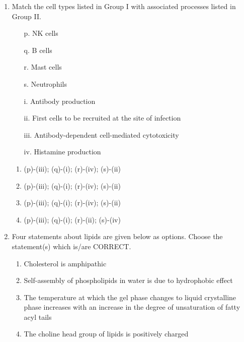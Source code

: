 \documentclass[journal,12pt,onecolumn]{IEEEtran}
\begin{document}
\begin{enumerate}
    \item \begin{minipage}{0.45\textwidth}
    Match the cell types listed in Group I with associated processes listed in Group II.
    \begin{itemize}
        \item[p.] NK cells
        \item[q.] B cells
        \item[r.] Mast cells
        \item[s.] Neutrophils
    \end{itemize}
    \end{minipage}
    \begin{minipage}{0.45\textwidth}
    \begin{itemize}
        \item[i.] Antibody production
        \item[ii.] First cells to be recruited at the site of infection
        \item[iii.] Antibody-dependent cell-mediated cytotoxicity
        \item[iv.] Histamine production
    \end{itemize}
    \end{minipage}
    \begin{enumerate}
        \item (p)-(iii); (q)-(i); (r)-(iv); (s)-(ii)
        \item (p)-(iii); (q)-(i); (r)-(iv); (s)-(ii)
        \item (p)-(iii); (q)-(i); (r)-(iv); (s)-(ii)
        \item (p)-(iii); (q)-(i); (r)-(ii); (s)-(iv)
    \end{enumerate}

    \item Four statements about lipids are given below as options. Choose the statement(s) which is/are CORRECT.
    \begin{enumerate}
        \item Cholesterol is amphipathic
        \item Self-assembly of phospholipids in water is due to hydrophobic effect
        \item The temperature at which the gel phase changes to liquid crystalline phase increases with an increase in the degree of unsaturation of fatty acyl tails
        \item The choline head group of lipids is positively charged
    \end{enumerate}


\end{enumerate}
\end{document}
